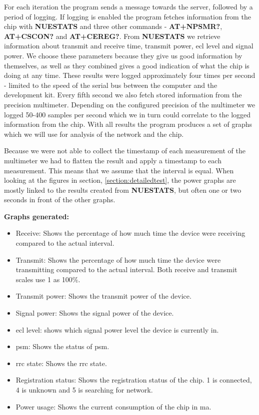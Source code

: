 \documentclass[USenglish]{ifimaster}  %
\begin{document}
For each iteration the program sends a message towards the server, followed by a period of logging. If logging is enabled the program fetches information from the chip with \textbf{NUESTATS} and three other commands - \textbf{AT+NPSMR?}, \textbf{AT+CSCON?} and \textbf{AT+CEREG?}. From \textbf{NUESTATS} we retrieve information about transmit and receive time, transmit power, \acrshort{ecl} level and signal power. We choose these parameters because they give us good information by themselves, as well as they combined gives a good indication of what the chip is doing at any time. These results were logged approximately four times per second - limited to the speed of the serial bus between the computer and the development kit. Every fifth second we also fetch stored information from the precision multimeter. Depending on the configured precision of the multimeter we logged 50-400 samples per second which we in turn could correlate to the logged information from the chip. With all results the program produces a set of graphs which we will use for analysis of the network and the chip.

Because we were not able to collect the timestamp of each measurement of the multimeter we had to flatten the result and apply a timestamp to each measurement. This means that we assume that the interval is equal. When looking at the figures in section, \vref{section:detailedtest}, the power graphs are mostly linked to the results created from \textbf{NUESTATS}, but often one or two seconds in front of the other graphs.

\textbf{Graphs generated:}
\begin{itemize}
  \item Receive: Shows the percentage of how much time the device were receiving compared to the actual interval.
  \item Transmit: Shows the percentage of how much time the device were transmitting compared to the actual interval. Both receive and transmit scales use 1 as 100\%.
  \item Transmit power: Shows the transmit power of the device.
  \item Signal power: Shows the signal power of the device.
  \item \acrshort{ecl} level: shows which signal power level the device is currently in.
  \item \acrshort{psm}: Shows the status of \acrshort{psm}.
  \item \acrshort{rrc} state: Shows the \acrshort{rrc} state.
  \item Registration status: Shows the registration status of the chip. 1 is connected, 4 is unknown and 5 is searching for network.
  \item Power usage: Shows the current consumption of the chip in \acrshort{ma}.
\end{itemize}
\end{document}
